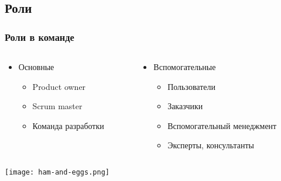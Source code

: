 \documentclass{../../slides-style}
\begin{document}
    \subsection{Роли}

    \begin{frame}
        \frametitle{Роли в команде}
        \begin{columns}
            \begin{column}{0.5\textwidth}
                \begin{itemize}
                    \item Основные 
                    \begin{itemize}
                        \item Product owner
                        \item Scrum master
                        \item Команда разработки
                    \end{itemize}
                \end{itemize}
            \end{column}
            \begin{column}{0.5\textwidth}
                \begin{itemize}
                    \item Вспомогательные 
                    \begin{itemize}
                        \item Пользователи
                        \item Заказчики
                        \item Вспомогательный менеджмент
                        \item Эксперты, консультанты
                    \end{itemize}
                \end{itemize}
            \end{column}
        \end{columns}
        \begin{center}
            \texttt{[image: ham-and-eggs.png]}
        \end{center}
    \end{frame}
\end{document}
